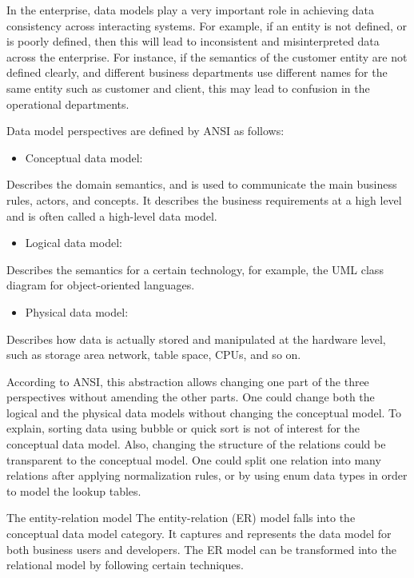 \documentclass[]{book}
\providecommand{\tightlist}{%
  \setlength{\itemsep}{0pt}\setlength{\parskip}{0pt}}
\begin{document}
In the enterprise, data models play a very important role in achieving data consistency across interacting systems. For example, if an entity is not defined, or is poorly defined, then this will lead to inconsistent and misinterpreted data across the enterprise. For instance, if the semantics of the customer entity are not defined clearly, and different business departments use different names for the same entity such as customer and client, this may lead to confusion in the operational departments.

Data model perspectives are defined by ANSI as follows:

\begin{itemize}
\tightlist
\item
  Conceptual data model:
\end{itemize}

Describes the domain semantics, and is used to communicate the main business rules, actors, and concepts. It describes the business requirements at a high level and is often called a high-level data model.

\begin{itemize}
\tightlist
\item
  Logical data model:
\end{itemize}

Describes the semantics for a certain technology, for example, the UML class diagram for object-oriented languages.

\begin{itemize}
\tightlist
\item
  Physical data model:
\end{itemize}

Describes how data is actually stored and manipulated at the hardware level, such as storage area network, table space, CPUs, and so on.

According to ANSI, this abstraction allows changing one part of the three perspectives without amending the other parts. One could change both the logical and the physical data models without changing the conceptual model. To explain, sorting data using bubble or quick sort is not of interest for the conceptual data model. Also, changing the structure of the relations could be transparent to the conceptual model. One could split one relation into many relations after applying normalization rules, or by using enum data types in order to model the lookup tables.

The entity-relation model
The entity-relation (ER) model falls into the conceptual data model category. It captures and represents the data model for both business users and developers. The ER model can be transformed into the relational model by following certain techniques.
\end{document}
